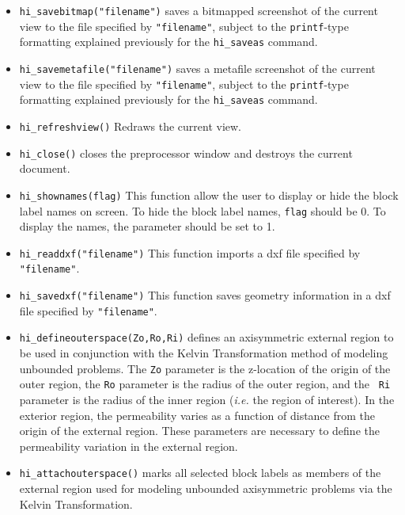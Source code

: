 \begin{itemize}
\item \texttt{hi\_savebitmap("filename")} saves a bitmapped screenshot of the current
view to the file specified by \texttt{"filename"}, subject to the
\texttt{printf}-type formatting explained previously for the
\texttt{hi\_saveas} command.

\item \texttt{hi\_savemetafile("filename")} saves a metafile screenshot of the current
view to the file specified by \texttt{"filename"}, subject to the
\texttt{printf}-type formatting explained previously for the
\texttt{hi\_saveas} command.

\item \texttt{hi\_refreshview()} Redraws the current view.

\item \texttt{hi\_close()} closes the preprocessor window and
destroys the current document.

\item \texttt{hi\_shownames(flag)} This function allow the user to display or hide the
block label names on screen. To hide the block label names,
\texttt{flag} should be 0. To display the names, the parameter
should be set to 1.

\item{\tt hi\_readdxf("filename")} This function imports a dxf file specified by {\tt "filename"}.

\item{\tt hi\_savedxf("filename")} This function saves geometry information in a dxf file specified by {\tt "filename"}.

\item{\tt hi\_defineouterspace(Zo,Ro,Ri)} defines
an axisymmetric external region to be used in conjunction with the
Kelvin Transformation method of modeling unbounded problems.  The
{\tt Zo} parameter is the z-location of the origin of the outer region,
the {\tt Ro} parameter is the radius of the outer region, and the {\tt
Ri} parameter is the radius of the inner region ({\em i.e.} the region of
interest). In the exterior region, the permeability varies as a function of
distance from the origin of the external region.  These parameters
are necessary to define the permeability variation in the external
region.

\item{\tt hi\_attachouterspace()} marks all
selected block labels as members of the external region used for
modeling unbounded axisymmetric problems via the Kelvin
Transformation.


\end{itemize}
